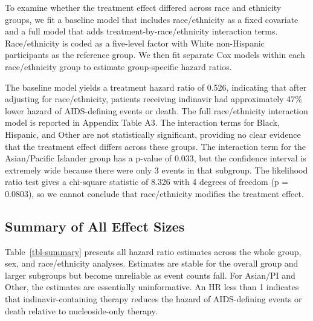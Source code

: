 \documentclass[
  letterpaper,
  DIV=11,
  numbers=noendperiod]{scrartcl}
\begin{document}
To examine whether the treatment effect differed across race and
ethnicity groups, we fit a baseline model that includes race/ethnicity
as a fixed covariate and a full model that adds
treatment-by-race/ethnicity interaction terms. Race/ethnicity is coded
as a five-level factor with White non-Hispanic participants as the
reference group. We then fit separate Cox models within each
race/ethnicity group to estimate group-specific hazard ratios.

The baseline model yields a treatment hazard ratio of 0.526, indicating
that after adjusting for race/ethnicity, patients receiving indinavir
had approximately 47\% lower hazard of AIDS-defining events or death.
The full race/ethnicity interaction model is reported in Appendix Table
A3. The interaction terms for Black, Hispanic, and Other are not
statistically significant, providing no clear evidence that the
treatment effect differs across these groups. The interaction term for
the Asian/Pacific Islander group has a p-value of 0.033, but the
confidence interval is extremely wide because there were only 3 events
in that subgroup. The likelihood ratio test gives a chi-square statistic
of 8.326 with 4 degrees of freedom (p = 0.0803), so we cannot conclude
that race/ethnicity modifies the treatment effect.

\subsection{Summary of All Effect
Sizes}\label{summary-of-all-effect-sizes}

Table~\ref{tbl-summary} presents all hazard ratio estimates across the
whole group, sex, and race/ethnicity analyses. Estimates are stable for
the overall group and larger subgroups but become unreliable as event
counts fall. For Asian/PI and Other, the estimates are essentially
uninformative. An HR less than 1 indicates that indinavir-containing
therapy reduces the hazard of AIDS-defining events or death relative to
nucleoside-only therapy.
\end{document}
